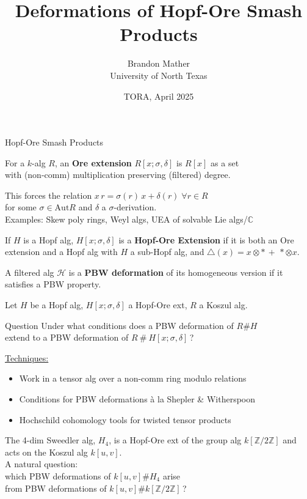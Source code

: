 \documentclass{beamer}
\title{Deformations of Hopf-Ore Smash Products}
\author{Brandon Mather\\ University of North Texas}
\date{TORA, April 2025}
\begin{document}
\maketitle

\begin{frame}{Hopf-Ore Smash Products}
\begin{definition}
    For a \(k\)-alg \(R\), an \textbf{Ore extension} \(R[x;\sigma,\delta]\) is \(R[x]\) as a set \\with (non-comm) multiplication preserving (filtered) degree. 
\end{definition}
This forces the relation \(x\,r=\sigma(r)\,x+\delta(r)\;\forall r\in R\) \\ for some \(\sigma\in \text{Aut}R\) and \(\delta\) a \(\sigma\)-derivation.
\\Examples: Skew poly rings, Weyl algs, UEA of solvable Lie algs/\(\mathbb{C}\)
\begin{definition}
    If \(H\) is a Hopf alg, \(H[x;\sigma,\delta]\) is a \textbf{Hopf-Ore Extension} if it is both an Ore extension and a Hopf alg with \(H\) a sub-Hopf alg, and \(\triangle(x)=x\otimes \ast\,+\,*\otimes x\).
\end{definition}
\begin{definition}
    A filtered alg \(\mathcal{H}\) is a \textbf{PBW deformation} of its homogeneous version if it satisfies a PBW property.
\end{definition}
\end{frame}

\begin{frame} 
    Let \(H\) be a Hopf alg, \(H[x;\sigma,\delta]\) a Hopf-Ore ext, \(R\) a Koszul alg.
\begin{beamerboxesrounded}{Question}
    Under what conditions does a PBW deformation of \(R\#H\) \\extend to a PBW deformation of \(R\ \#\ H[x;\sigma,\delta]\)\,?
\end{beamerboxesrounded}

\underline{Techniques:}
\begin{itemize}
    \item Work in a tensor alg over a non-comm ring modulo relations
    \item Conditions for PBW deformations \`a la Shepler \& Witherspoon
    \item Hochschild cohomology tools for twisted tensor products
\end{itemize}
\begin{example}
   The 4-dim Sweedler alg, \(H_4\), is a  Hopf-Ore ext of the group alg \(k[\mathbb{Z}/2\mathbb{Z}]\) and acts on the Koszul alg \(k[u,v]\).
   \\A natural question: \\which PBW deformations of \(k[u,v]\#H_4\) arise \\ \hspace{0.2cm}from PBW deformations of \(k[u,v]\#k[\mathbb{Z}/2\mathbb{Z}]\)\,?
\end{example}

\end{frame}
\end{document}
